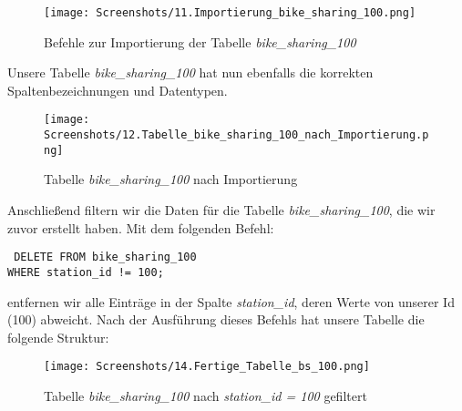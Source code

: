 \documentclass[a4paper, 12pt]{article}
\begin{document}
\vspace{\baselineskip}

\begin{figure}[ht]
    \centering
    \texttt{[image: Screenshots/11.Importierung\_bike\_sharing\_100.png]}
    \par Befehle zur Importierung der Tabelle \textit{bike\_sharing\_100}
\end{figure}

\vspace{\baselineskip}

{\fontsize{12}{15}\selectfont
Unsere Tabelle \textit{bike\_sharing\_100} hat nun ebenfalls die korrekten Spaltenbezeichnungen und Datentypen.

\vspace{\baselineskip}

\begin{figure}[ht]
    \centering
    \texttt{[image: Screenshots/12.Tabelle\_bike\_sharing\_100\_nach\_Importierung.png]}
    \par Tabelle \textit{bike\_sharing\_100} nach Importierung
\end{figure}

\vspace{\baselineskip}

\newpage

Anschließend filtern wir die Daten für die Tabelle \textit{bike\_sharing\_100}, die wir zuvor erstellt haben. Mit dem folgenden Befehl:

\vspace{\baselineskip}

{\fontsize{10}{12}\selectfont
\texttt{%
DELETE FROM bike\_sharing\_100 \\ WHERE station\_id != 100; }}

\vspace{\baselineskip}

entfernen wir alle Einträge in der Spalte \textit{station\_id}, deren Werte von unserer Id (100) abweicht. Nach der Ausführung dieses Befehls hat unsere Tabelle die folgende Struktur:} 

\vspace{\baselineskip}

\begin{figure}[ht]
    \centering
     \texttt{[image: Screenshots/14.Fertige\_Tabelle\_bs\_100.png]}
     \par Tabelle 
     \textit{bike\_sharing\_100} nach 
     \textit{station\_id = 100} gefiltert
\end{figure}
\end{document}
